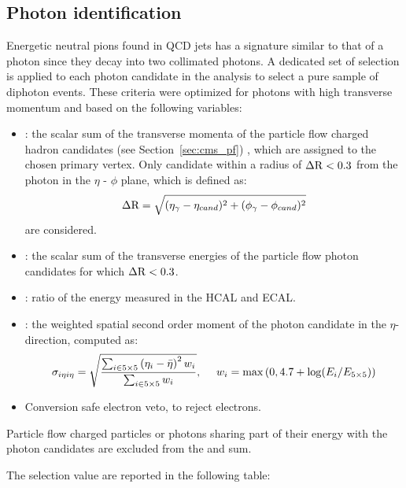 \subsection{Photon identification}
Energetic neutral pions found in QCD jets has a signature similar to that of a photon since they decay into two collimated
photons. A dedicated set of selection is applied to each photon candidate in the analysis to select a pure
sample of diphoton events. These criteria were optimized for photons with high transverse
momentum and based on the following variables:

\begin{itemize}  
\item \chIso: the scalar sum of the transverse momenta of the particle flow charged hadron
candidates (see Section~\ref{sec:cms_pf}) , which are assigned to the chosen primary vertex. Only candidate
within a radius of $\Delta\mathrm{R} < 0.3$ from the photon in the $\eta$ - $\phi$ plane, which is
defined as:
\[
\Delta\mathrm{R} = \sqrt{(\eta_\gamma-\eta_{cand})^2 + (\phi_\gamma-\phi_{cand})^2}
  \]
are considered.

\item \phoIso: the scalar sum of the transverse energies of the particle flow photon candidates for which $\Delta\mathrm{R} < 0.3$.
  
\item \hoe: ratio of the energy measured in the HCAL and ECAL.

\item \sieie: the weighted spatial second order moment of the photon candidate in the
  $\eta$-direction, computed as:
  \[
    \sigma_{i\eta i\eta} = \sqrt{ \frac 
      { \sum_{i \in 5\times5} \left( \eta_i - \bar \eta \right )^2 w_i
      } {\sum_{i \in 5\times5} w_i} }, ~~~~ 
    w_i = \max \left( 0, 4.7 + \log(E_i / E_{5\times5}) \right )
\]


\item Conversion safe electron veto, to reject electrons.

\end{itemize}

Particle flow charged particles or photons sharing part of their energy with the photon candidates
are excluded from the \chIso and \phoIso sum. 

The selection value are reported in the following table:


